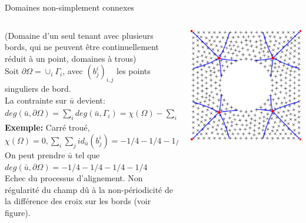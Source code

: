 \documentclass[compress,10pt,aspectratio=169]{beamer}
\begin{document}
\begin{frame}{Domaines non-simplement connexes}
\small
\vspace{-0.5cm}
\begin{columns}
\begin{column}{0.85\textwidth}
{\color{onera_gray}(Domaine d'un seul tenant avec plusieurs bords, qui ne peuvent être continuellement réduit à un point, domaines à trous)}\\\vspace{0.08cm}
Soit $\partial\Omega=\cup_i\Gamma_i$, avec $(b_j^i)_{i,j}$ les points singuliers de bord.\\\vspace{0.12cm}
La contrainte sur $\bar{u}$ devient:
    $deg(\bar{u}, \partial\Omega)=\sum_i deg(\bar{u},\Gamma_i)=\chi(\Omega)-\sum_i\sum_jid_{\bar{u}}(b_j^i).$\\\vspace{0.12cm}
\textbf{Exemple:} Carré troué, $\chi(\Omega)=0, \sum_i\sum_jid_{\bar{u}}(b_j^i)=-1/4-1/4-1/4-1/4$\\\vspace{0.12cm}
On peut prendre $\bar{u}$ tel que $deg(\bar{u}, \partial\Omega)=-1/4-1/4-1/4-1/4$\\\vspace{0.12cm}
{\color{onera_gray} Echec du processus d'alignement. Non régularité du champ dû à la non-périodicité de la différence des croix sur les bords (voir figure).}\\\vspace{0.08cm}
\end{column}
\begin{column}{0.18\textwidth}
\centering
\includegraphics[scale=0.32]{images/carreDiscVide_stream_non_align_beam.pdf}

\end{column}
\end{columns}
\end{frame}
\end{document}

